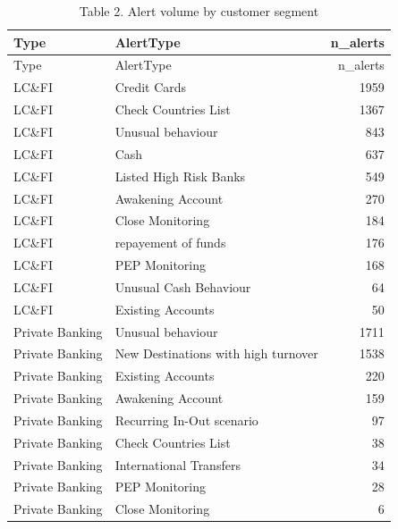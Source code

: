 \documentclass[
]{article}
\begin{document}
\begin{longtable}[]{@{}llr@{}}
\caption{Table 2. Alert volume by customer segment}\tabularnewline
\toprule\noalign{}
Type & AlertType & n\_alerts \\
\midrule\noalign{}
\endfirsthead
\toprule\noalign{}
Type & AlertType & n\_alerts \\
\midrule\noalign{}
\endhead
\bottomrule\noalign{}
\endlastfoot
LC\&FI & Credit Cards & 1959 \\
LC\&FI & Check Countries List & 1367 \\
LC\&FI & Unusual behaviour & 843 \\
LC\&FI & Cash & 637 \\
LC\&FI & Listed High Risk Banks & 549 \\
LC\&FI & Awakening Account & 270 \\
LC\&FI & Close Monitoring & 184 \\
LC\&FI & repayement of funds & 176 \\
LC\&FI & PEP Monitoring & 168 \\
LC\&FI & Unusual Cash Behaviour & 64 \\
LC\&FI & Existing Accounts & 50 \\
Private Banking & Unusual behaviour & 1711 \\
Private Banking & New Destinations with high turnover & 1538 \\
Private Banking & Existing Accounts & 220 \\
Private Banking & Awakening Account & 159 \\
Private Banking & Recurring In-Out scenario & 97 \\
Private Banking & Check Countries List & 38 \\
Private Banking & International Transfers & 34 \\
Private Banking & PEP Monitoring & 28 \\
Private Banking & Close Monitoring & 6 \\
\end{longtable}
\end{document}
